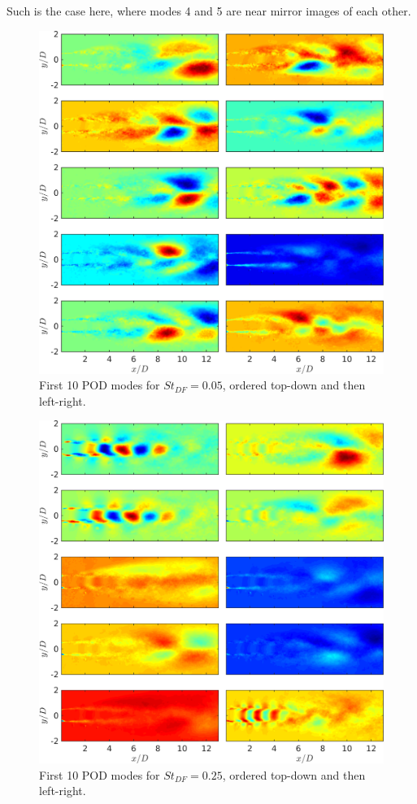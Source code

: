 Such is the case here, where modes 4 and 5 are near mirror images of each other.
\begin{figure}
	\centering
	\includegraphics[width=1\linewidth]{Figures/ch4_St005_POD_Modes.png}
	\caption{First 10 POD modes for $St_{DF} = 0.05$, ordered top-down and then left-right.}
	\label{fig:ch4_St005_PODmodes}
\end{figure}
\begin{figure}
	\centering
	\includegraphics[width=1\linewidth]{Figures/ch4_St025_POD_Modes.png}
	\caption{First 10 POD modes for $St_{DF} = 0.25$, ordered top-down and then left-right.}
	\label{fig:ch4_St025_PODmodes}
\end{figure}

